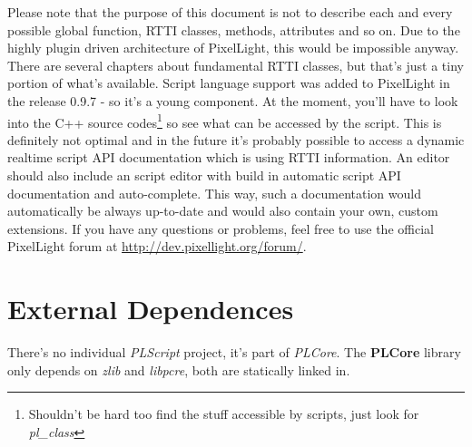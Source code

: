 Please note that the purpose of this document is not to describe each and every possible global function, \ac{RTTI} classes, methods, attributes and so on. Due to the highly plugin driven architecture of PixelLight, this would be impossible anyway. There are several chapters about fundamental \ac{RTTI} classes, but that's just a tiny portion of what's available. Script language support was added to PixelLight in the release 0.9.7 - so it's a young component. At the moment, you'll have to look into the C++ source codes\footnote{Shouldn't be hard too find the stuff accessible by scripts, just look for \emph{pl\_class}} so see what can be accessed by the script. This is definitely not optimal and in the future it's probably possible to access a dynamic realtime script \ac{API} documentation which is using \ac{RTTI} information. An editor should also include an script editor with build in automatic script \ac{API} documentation and auto-complete. This way, such a documentation would automatically be always up-to-date and would also contain your own, custom extensions. If you have any questions or problems, feel free to use the official PixelLight forum at \url{http://dev.pixellight.org/forum/}.




\section{External Dependences}
There's no individual \emph{PLScript} project, it's part of \emph{PLCore}. The \textbf{PLCore} library only depends on \emph{zlib} and \emph{libpcre}, both are statically linked in.
